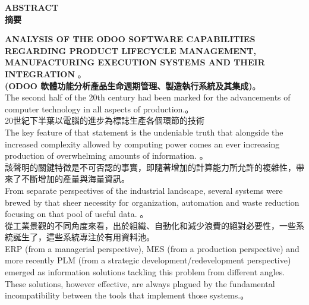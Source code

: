 \renewcommand{\baselinestretch}{1.5} %
\setcounter{page}{2}
\sectionef
{} %
\begin{center}
\LARGE\textbf{ABSTRACT}\\
\LARGE\textbf{摘要}\\
\end{center}
\fontsize{14}{18}\sectionef \textbf
 {ANALYSIS  OF  THE ODOO  SOFTWARE  CAPABILITIES  REGARDING  
 PRODUCT  LIFECYCLE  MANAGEMENT,  MANUFACTURING  EXECUTION 
 SYSTEMS  AND  THEIR  INTEGRATION }。\\[2pt]
\fontsize{16}{18}\sectionef \textbf
  {(ODOO 軟體功能分析產品生命週期管理、製造執行系統及其集成)}。\\[15pt]

\fontsize{14pt}{2.5pt}\sectionef 
{ The second half of the 20th century had been marked for the advancements of computer 
technology in all aspects of production.}。\\[1pt]

\fontsize{14pt}{5pt}\sectionef
 {20世紀下半葉以電腦的進步為標誌生產各個環節的技術}\\[15pt]

\fontsize{14pt}{2.5pt}\sectionef 
{ The key feature of that statement is the undeniable truth that alongside the increased 
complexity allowed by computing power comes an ever increasing production of 
overwhelming amounts of information. }。\\[1pt]

\fontsize{14pt}{5pt}\sectionef
 {該聲明的關鍵特徵是不可否認的事實，即隨著增加的計算能力所允許的複雜性，帶來了不斷增加的產量與海量資訊。}\\[15pt]

\fontsize{14pt}{2.5pt}\sectionef 
{From separate perspectives of the industrial landscape, several systems were brewed by 
that sheer necessity for organization, automation and waste reduction focusing on that pool 
of useful data. }。\\[1pt]

\fontsize{14pt}{5pt}\sectionef
 {從工業景觀的不同角度來看，出於組織、自動化和減少浪費的絕對必要性，一些系統誕生了，這些系統專注於有用資料池。}\\[15pt]

\fontsize{14pt}{2.5pt}\sectionef 
{ERP (from a managerial perspective), MES (from a production perspective) and more 
recently PLM (from a strategic development/redevelopment perspective) emerged as 
information solutions tackling this problem from different angles. These solutions, however 
effective, are always plagued by the fundamental incompatibility between the tools that 
implement those systems.}。\\[1pt]

